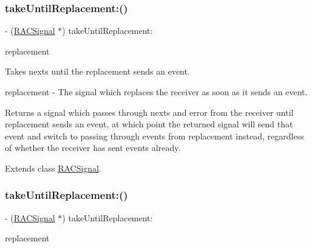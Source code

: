 \subsubsection{\texorpdfstring{take\+Until\+Replacement\+:()}{takeUntilReplacement:()}\hspace{0.1cm}{\footnotesize\ttfamily [1/3]}}
{\footnotesize\ttfamily -\/ (\mbox{\hyperlink{interface_r_a_c_signal}{R\+A\+C\+Signal}} $\ast$) take\+Until\+Replacement\+: \begin{DoxyParamCaption}\item[{(\mbox{\hyperlink{interface_r_a_c_signal}{R\+A\+C\+Signal}} $\ast$)}]{replacement }\end{DoxyParamCaption}}

Takes {\ttfamily next}s until the {\ttfamily replacement} sends an event.

replacement -\/ The signal which replaces the receiver as soon as it sends an event.

Returns a signal which passes through {\ttfamily next}s and {\ttfamily error} from the receiver until {\ttfamily replacement} sends an event, at which point the returned signal will send that event and switch to passing through events from {\ttfamily replacement} instead, regardless of whether the receiver has sent events already. 

Extends class \mbox{\hyperlink{interface_r_a_c_signal_aa8536c9726338e10176997936be011ed}{R\+A\+C\+Signal}}.

\mbox{\label{category_r_a_c_signal_07_operations_08_aa8536c9726338e10176997936be011ed}} 
\subsubsection{\texorpdfstring{take\+Until\+Replacement\+:()}{takeUntilReplacement:()}\hspace{0.1cm}{\footnotesize\ttfamily [2/3]}}
{\footnotesize\ttfamily -\/ (\mbox{\hyperlink{interface_r_a_c_signal}{R\+A\+C\+Signal}} $\ast$) take\+Until\+Replacement\+: \begin{DoxyParamCaption}\item[{(\mbox{\hyperlink{interface_r_a_c_signal}{R\+A\+C\+Signal}} $\ast$)}]{replacement }\end{DoxyParamCaption}}

